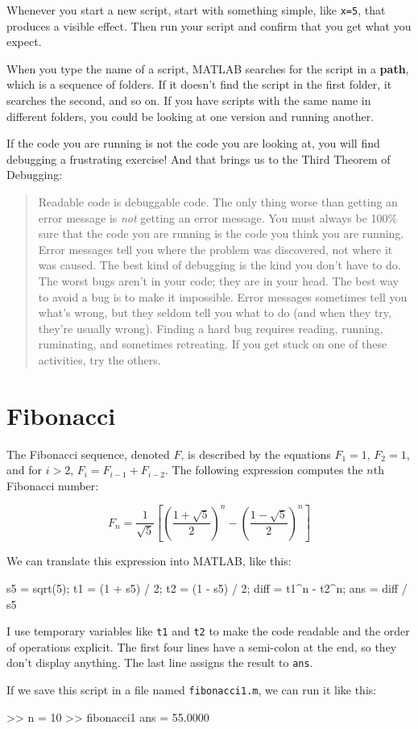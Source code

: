 \documentclass[
]{book}
\numberwithin{Answer}{chapter}
\numberwithin{Exercise}{chapter}
\newcommand{\displaythrm}[1]{%
    \ifthenelse{\equal{#1}{1}}%
        {Readable code is debuggable code.}{%
    \ifthenelse{\equal{#1}{2}}%
        {The only thing worse than getting an error message is {\em
         not} getting an error message.}{%
    \ifthenelse{\equal{#1}{3}}%
        {You must always be 100\% sure that the code you are running
         is the code you think you are running.}{%
    \ifthenelse{\equal{#1}{4}}%
        {Error messages tell you where the problem was discovered,
         not where it was caused.}{%
    \ifthenelse{\equal{#1}{5}}%
        {The best kind of debugging is the kind you don't have to do.}{%
    \ifthenelse{\equal{#1}{6}}%
        {The worst bugs aren't in your code; they are in your head.}{%
    \ifthenelse{\equal{#1}{7}}%
        {The best way to avoid a bug is to make it impossible.}{%
    \ifthenelse{\equal{#1}{8}}%
        {Error messages sometimes tell you what's wrong, but they
         seldom tell you what to do (and when they try, they're usually
         wrong).}{%
    \ifthenelse{\equal{#1}{9}}%
        {Finding a hard bug requires reading, running, ruminating,
         and sometimes retreating.  If you get stuck on one of these
         activities, try the others.}{%
    {}%
}}}}}}}}}}%
\begin{document}
Whenever you start a new script, start with something simple,
like {\tt x=5}, that produces a visible effect.  Then run your script
and confirm that you get what you expect.

When you type the name of a script, MATLAB searches for the script in a {\bf path}, which is a sequence of folders.  If it doesn't find the script in the first folder, it searches the second, and so on.
If you have scripts with the same name in different folders, you could be looking at one version and running another.

If the code you are running is not the code you are looking
at, you will find debugging a frustrating exercise!  And that brings
us to the Third Theorem of Debugging:

\begin{quote}
\displaythrm{3}
\end{quote}


\section{Fibonacci}

The Fibonacci sequence, denoted $F$, is described by the equations
$F_1 = 1$, $F_2 = 1$, and for $i > 2$, $F_{i} = F_{i-1} + F_{i-2}$.
The following expression computes the $n$th Fibonacci number:

\begin{equation}
F_n = \frac{1}{\sqrt{5}}
\left[
\left( \frac{1 + \sqrt{5}}{2} \right)^{n} -
\left( \frac{1 - \sqrt{5}}{2} \right)^{n}
\right]
\end{equation}

We can translate this expression into MATLAB, like this:

\begin{code}
s5 = sqrt(5);
t1 = (1 + s5) / 2;
t2 = (1 - s5) / 2;
diff = t1^n - t2^n;
ans = diff / s5
\end{code}

I use temporary variables like {\tt t1} and {\tt t2} to make the code readable and the order of operations explicit.  The first four lines have a semi-colon at the end, so they don't display anything.  The last line assigns the result to {\tt ans}.

If we save this script in a file named {\tt fibonacci1.m}, we can run it like this:

\begin{code}
>> n = 10
>> fibonacci1
ans = 55.0000
\end{code}
\end{document}
